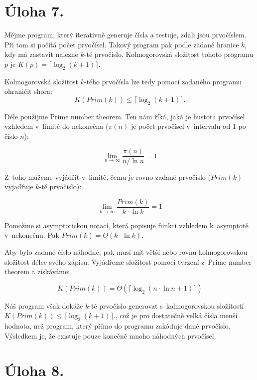 \documentclass[a4paper]{article}
\begin{document}
\section*{Úloha 7.}
Mějme program, který iterativně generuje čísla a testuje, zdali jsou prvočíslem. Při tom si počítá počet prvočísel. Takový program pak podle zadané hranice $k$, kdy má zastavit nalezne $k$-té prvočíslo. Kolmogorovská složitost tohoto programu $p$ je $K(p) = \lceil \log_{2}(k + 1)\rceil$.

Kolmogorovská složitost $k$-tého prvočísla lze tedy pomocí zadaného programu ohraničit shora:
$$K(Prim(k)) \leq \lceil \log_{2}(k + 1)\rceil.$${}

Déle použijme Prime number theorem. Ten nám říká, jaká je hustota prvočísel vzhledem v~limitě do nekonečna ($\pi(n)$ je počet prvočísel v~intervalu od 1 po číslo $n$):

$$\lim_{n \to \infty} \frac{\pi(n)} {n / \ln n} = 1$$

Z~toho můžeme vyjádřit v~limitě, čemu je rovno zadané prvočíslo ($\mathit{Prim}(k)$ vyjadřuje $k$-té prvočíslo):

$$\lim_{k \to \infty} \frac{Prim(k)} {k \cdot \ln k} = 1$$

Pomožme si asymptotickou notací, která popisuje funkci vzhledem k~asymptotě v~nekonečnu. Pak $Prim(k) = \Theta(k \cdot \ln k)$.

Aby bylo zadané číslo náhodné, pak musí mít větší nebo rovnu kolmogorovskou složitost délce svého zápisu. Vyjádřeme složitost pomocí tvrzení z~Prime number theorem a získáváme:

$$K(Prim(k)) = \Theta(\lceil \log_{2}(n \cdot \ln n + 1)\rceil)$$

Náš program však dokáže $k$-té prvočíslo generovat s~kolmogorovskou složitostí $K(Prim(k)) \leq \lceil \log_{2}(k + 1)\rceil.$, což je pro dostatečně velká čísla menší hodnota, než program, který přímo do programu zakóduje dané prvočíslo. Výsledkem je, že existuje pouze konečně mnoho náhodných prvočísel.


\section*{Úloha 8.}
\end{document}
